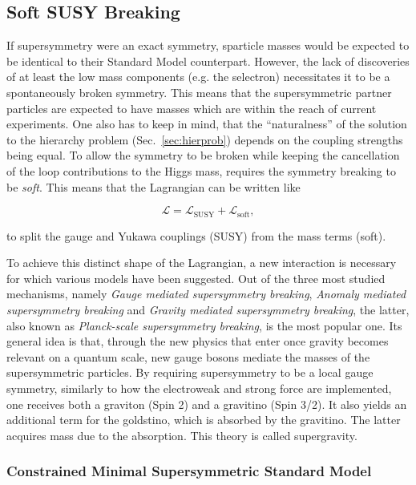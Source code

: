 \subsection{Soft SUSY Breaking}

If supersymmetry were an exact symmetry, sparticle masses would be expected to be identical to their Standard Model counterpart. However, the lack of discoveries of at least the low mass components (e.g. the selectron) necessitates it to be a spontaneously broken symmetry. This means that the supersymmetric partner particles are expected to have masses which are within the reach of current experiments. One also has to keep in mind, that the ``naturalness'' of the solution to the hierarchy problem (Sec.~\ref{sec:hierprob}) depends on the coupling strengths being equal. To allow the symmetry to be broken while keeping the cancellation of the loop contributions to the Higgs mass, requires the symmetry breaking to be \textit{soft}. This means that the Lagrangian can be written like

\begin{equation}
  \label{eq:softlagr}
  \mathcal{L} = \mathcal{L}_{\text{SUSY}} + \mathcal{L}_{\text{soft}},
\end{equation}

\noindent to split the gauge and Yukawa couplings (SUSY) from the mass terms (soft).


To achieve this distinct shape of the Lagrangian, a new interaction is necessary for which various models have been suggested. Out of the three most studied mechanisms, namely \textit{Gauge mediated supersymmetry breaking}, \textit{Anomaly mediated supersymmetry breaking} and \textit{Gravity mediated supersymmetry breaking}, the latter, also known as \textit{Planck-scale supersymmetry breaking}, is the most popular one. Its general idea is that, through the new physics that enter once gravity becomes relevant on a quantum scale, new gauge bosons mediate the masses of the supersymmetric particles. By requiring supersymmetry to be a local gauge symmetry, similarly to how the electroweak and strong force are implemented, one receives both a graviton (Spin 2) and a gravitino (Spin 3/2). It also yields an additional term for the goldstino, which is absorbed by the gravitino. The latter acquires mass due to the absorption. This theory is called supergravity.

\subsubsection{Constrained Minimal Supersymmetric Standard Model}


